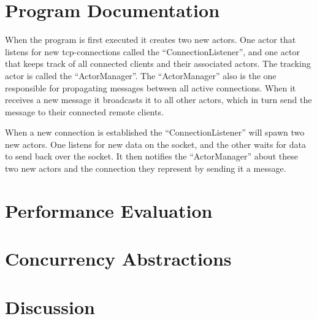 \section{Program Documentation}
\begin{figure}
  \centering
  \def\svgwidth{\columndwidth}
  
\end{figure}

When the program is first executed it creates two new actors. One actor that listens for new tcp-connections called the ``ConnectionListener'', and one actor that keeps track of all connected clients and their associated actors. The tracking actor is called the ``ActorManager''. The ``ActorManager'' also is the one responsible for propagating messages between all active connections. When it receives a new message it broadcasts it to all other actors, which in turn send the message to their connected remote clients.

When a new connection is established the ``ConnectionListener'' will spawn two new actors. One listens for new data on the socket, and the other waits for data to send back over the socket. It then notifies the ``ActorManager'' about these two new actors and the connection they represent by sending it a message.

\section{Performance Evaluation}

\section{Concurrency Abstractions}

\section{Discussion}



